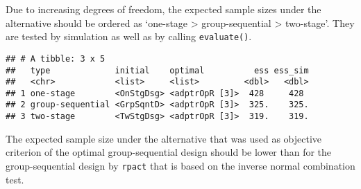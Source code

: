 \documentclass[
]{book}
\newenvironment{Shaded}{\begin{snugshade}}{\end{snugshade}}
\newcommand{\CommentTok}[1]{\textcolor[rgb]{0.56,0.35,0.01}{\textit{#1}}}
\newcommand{\DataTypeTok}[1]{\textcolor[rgb]{0.13,0.29,0.53}{#1}}
\newcommand{\DecValTok}[1]{\textcolor[rgb]{0.00,0.00,0.81}{#1}}
\newcommand{\FloatTok}[1]{\textcolor[rgb]{0.00,0.00,0.81}{#1}}
\newcommand{\KeywordTok}[1]{\textcolor[rgb]{0.13,0.29,0.53}{\textbf{#1}}}
\newcommand{\NormalTok}[1]{#1}
\newcommand{\OperatorTok}[1]{\textcolor[rgb]{0.81,0.36,0.00}{\textbf{#1}}}
\newcommand{\StringTok}[1]{\textcolor[rgb]{0.31,0.60,0.02}{#1}}
\begin{document}
Due to increasing degrees of freedom, the expected sample sizes under the
alternative should be ordered as `one-stage \textgreater{} group-sequential \textgreater{} two-stage'.
They are tested by simulation as well as by calling \texttt{evaluate()}.

\begin{Shaded}
\end{Shaded}

\begin{verbatim}
## # A tibble: 3 x 5
##   type             initial    optimal          ess ess_sim
##   <chr>            <list>     <list>         <dbl>   <dbl>
## 1 one-stage        <OnStgDsg> <adptrOpR [3]>  428     428 
## 2 group-sequential <GrpSqntD> <adptrOpR [3]>  325.    325.
## 3 two-stage        <TwStgDsg> <adptrOpR [3]>  319.    319.
\end{verbatim}

The expected sample size under the alternative that was used as objective criterion
of the optimal group-sequential design should be lower than for the
group-sequential design by \texttt{rpact} that is based on the inverse normal
combination test.
\end{document}
